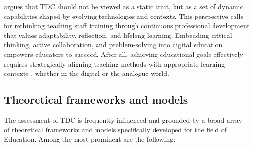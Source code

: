 \documentclass[english]{textolivre}
\begin{document}
\textcite{santos2023edigcompedu} argues that TDC should not be viewed as a static trait, but as a set of dynamic capabilities shaped by evolving technologies and contexts. This perspective calls for rethinking teaching staff training through continuous professional development that values adaptability, reflection, and lifelong learning. Embedding critical thinking, active collaboration, and problem-solving into digital education empowers educators to succeed. After all, achieving educational goals effectively requires strategically aligning teaching methods with appropriate learning contexts \cite{GarcesBastias2024}, whether in the digital or the analogue world.


\subsection{Theoretical frameworks and models}\label{sec-formato}
The assessment of TDC is frequently influenced and grounded by a broad array of theoretical frameworks and models specifically developed for the field of Education. Among the most prominent are the following:
\end{document}
